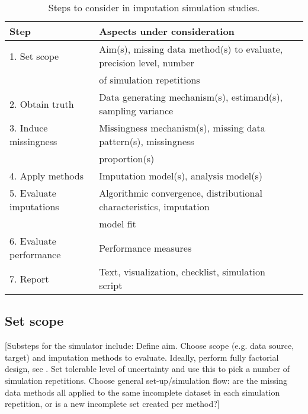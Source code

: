 \documentclass[bimj,fleqn]{w-art}
\begin{document}
\begin{table}[htb]
\begin{center}
\caption{Steps to consider in imputation simulation studies.}
\label{table:steps}
\begin{tabular}{lll}
\hline
Step                    & Aspects under consideration \\
\hline  
1. Set scope            & Aim(s), missing data method(s) to evaluate, precision level, number \\
                        & of simulation repetitions \\
2. Obtain truth         & Data generating mechanism(s), estimand(s), sampling variance \\
3. Induce missingness   & Missingness mechanism(s), missing data pattern(s), missingness \\
                        & proportion(s) \\
4. Apply methods        & Imputation model(s), analysis model(s) \\
5. Evaluate imputations & Algorithmic convergence, distributional characteristics, imputation \\
                        & model fit \\
6. Evaluate performance & Performance measures \\
7. Report               & Text, visualization, checklist, simulation script \\
\hline
\end{tabular}
\end{center}
\end{table}



\subsection{Set scope}

[Substeps for the simulator include: Define aim. Choose scope (e.g. data source, target) and imputation methods to evaluate. Ideally, perform fully factorial design, see \citet{morr18}. Set tolerable level of uncertainty and use this to pick a number of simulation repetitions. Choose general set-up/simulation flow: are the missing data methods all applied to the same incomplete dataset in each simulation repetition, or is a new incomplete set created per method?] 
\end{document}
